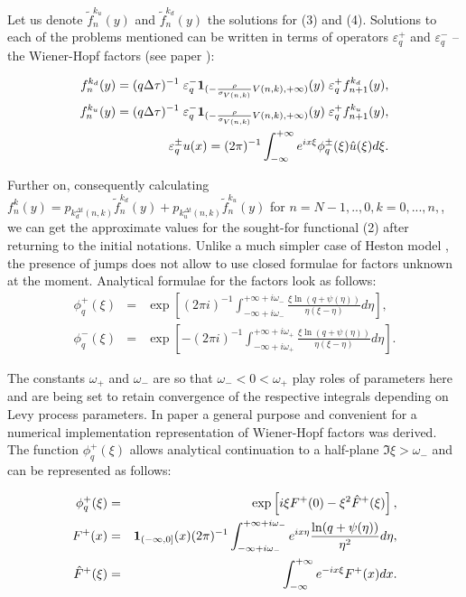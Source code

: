 \documentclass[a4paper]{jpconf}
\begin{document}
Let us denote $\widetilde{f}_n^{k_u}(y)$ and $\widetilde{f}_n^{k_d}(y)$ the solutions for (3) and (4). Solutions to each of the problems mentioned can be written in terms of operators $\varepsilon^{+}_{q}$ and $\varepsilon^{-}_{q}$ -- the Wiener-Hopf factors (see paper \cite{kudr_and_lev}):

\begin{eqnarray*}
	f_{n}^{k_{d}}(y) = (q{\Delta \tau})^{-1} \; \varepsilon^{-}_{q} {\bf 1}_{(- \frac{\rho}{\sigma_{V(n,k)}}V(n,k), +\infty)}(y) \; \varepsilon^{+}_{q} f_{n+1}^{k_d}(y),\\
	f_{n}^{k_{u}}(y) = (q{\Delta \tau})^{-1} \; \varepsilon^{-}_{q} {\bf 1}_{(- \frac{\rho}{\sigma_{V(n,k)}}V(n,k), +\infty)}(y) \; \varepsilon^{+}_{q} f_{n+1}^{k_u}(y),\\
	\varepsilon^\pm_q u(x) = (2\pi)^{-1} \int_{-\infty}^{+\infty} e^{ix\xi} \phi^\pm_q (\xi) \hat{u}(\xi) d\xi.
\end{eqnarray*}

Further on, consequently calculating $f_{n}^{k}(y) = p_{k^{{\Delta t}}_{d}(n,k)}\widetilde{f}^{k_d}_{n}(y) + p_{k^{{\Delta t}}_{u}(n,k)}\widetilde{f}^{k_u}_{n}(y)$ for $n=N-1,..,0, k = 0,...,n,$, we can get the approximate values for the sought-for functional (2) after returning to the initial notations. Unlike a much simpler case of Heston model \cite{kudr_rod}, the presence of jumps does not allow to use closed formulae for factors unknown at the moment. Analytical formulae for the factors look as follows:
\begin{eqnarray*}
	\phi^+_q(\xi)&=&\exp\left[(2\pi i)^{-1}
	\int_{-\infty+i\omega_-}^{+\infty+i\omega_-}\frac{\xi\ln(q+\psi(\eta))}
	{\eta(\xi-\eta)}d\eta\right],\\
	\phi^-_q(\xi)&=&\exp\left[-(2\pi i)^{-1}
	\int_{-\infty+i\omega_+}^{+\infty+i\omega_+}\frac{\xi\ln(q+\psi(\eta))}
	{\eta(\xi-\eta)}d\eta\right].
\end{eqnarray*}

The constants $\omega_+$ and $\omega_-$ are so that $\omega_-<0<\omega_+$ play roles of parameters here and are being set to retain convergence of the respective integrals depending on Levy process parameters. In paper \cite{kudr_mex} a general purpose and convenient for a numerical implementation representation of Wiener-Hopf factors was derived. The function $\phi^+_q(\xi)$ allows analytical continuation to a half-plane $\Im \xi>\omega_-$ and can be represented as follows:

\begin{eqnarray*}
	\phi^+_q(\xi)&=&\exp\left[i\xi F^+(0)-\xi^2\hat{F}^+(\xi)\right],\\ 
	F^+(x)&=&{\bf 1}_{(-\infty,0]}(x)(2\pi)^{-1}
	\int_{-\infty+i\omega_-}^{+\infty+i\omega_-}e^{ix\eta}\frac{\ln(q+\psi(\eta))}
	{\eta^2}d\eta,
	\\
	\hat{F}^+(\xi)&=&\int_{-\infty}^{+\infty}e^{-ix\xi}F^+(x)dx.
\end{eqnarray*}
\end{document}
